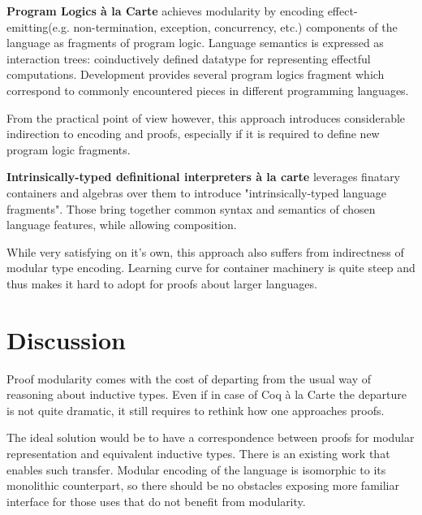 \documentclass[sigplan,nonacm]{acmart}
\begin{document}
\medskip
\textbf{Program Logics à la Carte}\cite{vistrup2025program} achieves modularity by encoding effect-emitting(e.g. non-termination, exception, concurrency, etc.) components of the language as fragments of program logic. 
Language semantics is expressed as interaction trees\cite{xia2019interaction}: coinductively defined datatype for representing effectful computations. 
Development provides several program logics fragment which correspond to commonly encountered pieces in different programming languages. 

From the practical point of view however, this approach introduces considerable indirection to encoding and proofs, especially if it is required to define new program logic fragments.



\medskip
\textbf{Intrinsically-typed definitional interpreters {\`a} la carte}\cite{van2022intrinsically} leverages finatary containers\cite{altenkirch2015indexed} and algebras over them to introduce "intrinsically-typed language fragments".
Those bring together common syntax and semantics of chosen language features, while allowing composition. 

While very satisfying on it's own, this approach also suffers from indirectness of modular type encoding. Learning curve for container machinery is quite steep and thus makes it hard to adopt for proofs about larger languages.




\medskip

\section{Discussion}

Proof modularity comes with the cost of departing from the usual way of reasoning about inductive types. 
Even if in case of Coq à la Carte the departure is not quite dramatic, it still requires to rethink how one approaches proofs.

The ideal solution would be to have a correspondence between proofs for modular representation and equivalent inductive types. There is an existing work\cite{cohen2024trocq} that enables such transfer. Modular encoding of the language is isomorphic to its monolithic counterpart, so there should be no obstacles exposing more familiar interface for those uses that do not benefit from modularity.
\end{document}

